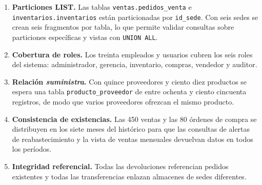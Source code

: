 \documentclass[11pt,oneside]{article}
\begin{document}
\begin{enumerate}[leftmargin=1.5em, itemsep=3pt]
  \item \textbf{Particiones LIST.} Las tablas \texttt{ventas.pedidos\_venta} e
        \texttt{inventarios.inventarios} est\'an particionadas por
        \texttt{id\_sede}. Con seis sedes se crean seis fragmentos por tabla,
        lo que permite validar consultas sobre particiones espec\'ificas y
        vistas con \texttt{UNION ALL}.

  \item \textbf{Cobertura de roles.} Los treinta empleados y usuarios cubren los
        seis roles del sistema: administrador, gerencia, inventario, compras,
        vendedor y auditor.

  \item \textbf{Relaci\'on \textit{suministra}.} Con quince proveedores y ciento
        diez productos se espera una tabla \texttt{producto\_proveedor} de entre
        ochenta y ciento cincuenta registros, de modo que varios proveedores
        ofrezcan el mismo producto.

  \item \textbf{Consistencia de existencias.} Las 450 ventas y las 80 \'ordenes
        de compra se distribuyen en los siete meses del hist\'orico para que las
        consultas de alertas de reabastecimiento y la vista de ventas mensuales
        devuelvan datos en todos los per\'iodos.

  \item \textbf{Integridad referencial.} Todas las devoluciones referencian
        pedidos existentes y todas las transferencias enlazan almacenes de sedes
        diferentes.
\end{enumerate}
\end{document}
